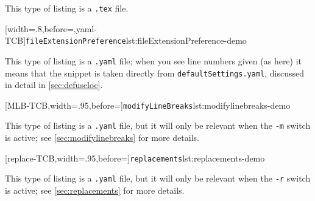  \begin{widepage}
  \begin{minipage}{.4\linewidth}
  \end{minipage}%
  \hfill
  \begin{minipage}{.4\linewidth}
   This type of listing is a \texttt{.tex} file.
  \end{minipage}%

  \begin{minipage}{.4\linewidth}
   [width=.8\linewidth,before=\centering,yaml-TCB]{\texttt{fileExtensionPreference}}{lst:fileExtensionPreference-demo}
  \end{minipage}%
  \hfill
  \begin{minipage}{.4\linewidth}
   This type of listing is a \texttt{.yaml} file; when you see line numbers given (as here)
   it means that the snippet is taken directly from \texttt{defaultSettings.yaml}, discussed in
   detail in \vref{sec:defuseloc}.
  \end{minipage}%

  \begin{minipage}{.6\linewidth}
   [MLB-TCB,width=.95\linewidth,before=\centering]{\texttt{modifyLineBreaks}}{lst:modifylinebreaks-demo}
  \end{minipage}%
  \hfill
  \begin{minipage}{.4\linewidth}
   This type of listing is a \texttt{.yaml} file, but it will only
   be relevant when the \texttt{-m} switch is active; see \vref{sec:modifylinebreaks}
   for more details.
  \end{minipage}%

  \begin{minipage}{.6\linewidth}
   [replace-TCB,width=.95\linewidth,before=\centering]{\texttt{replacements}}{lst:replacements-demo}
  \end{minipage}%
  \hfill
  \begin{minipage}{.4\linewidth}
   This type of listing is a \texttt{.yaml} file, but it will only
   be relevant when the \texttt{-r} switch is active; see \vref{sec:replacements}
   for more details.
  \end{minipage}%
 \end{widepage}

